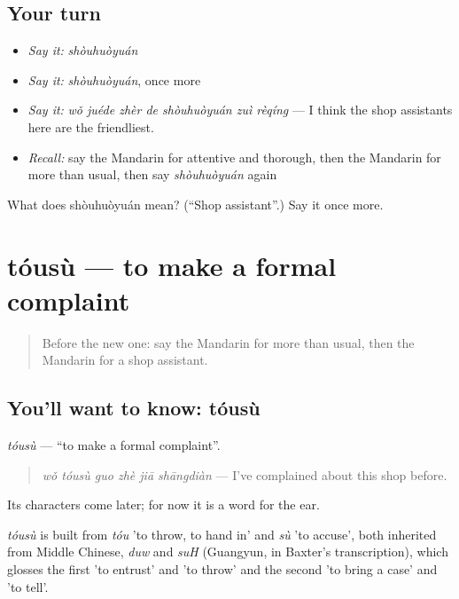 \subsection*{Your turn}
\begin{itemize}
\raggedright
  \item \emph{Say it:} \emph{shòuhuòyuán}
  \item \emph{Say it:} \emph{shòuhuòyuán}, once more
  \item \emph{Say it:} \emph{wǒ juéde zhèr de shòuhuòyuán zuì rèqíng} — I think the shop assistants here are the friendliest.
  \item \emph{Recall:} say the Mandarin for attentive and thorough, then the Mandarin for more than usual, then say \emph{shòuhuòyuán} again
\end{itemize}

\begin{tcolorbox}[breakable,colback=teal!4,colframe=teal!35!black,title={Before you move on}]
What does shòuhuòyuán mean? (\textquotedblleft{}Shop assistant\textquotedblright{}.) Say it once more.
\end{tcolorbox}
\section[tóusù]{tóusù — to make a formal complaint}

\label{lesson:ZH-C525-tousu}



\begin{quote}
Before the new one: say the Mandarin for more than usual, then the Mandarin for a shop assistant.
\end{quote}

\subsection*{You'll want to know: tóusù}
\emph{tóusù} — \textquotedblleft{}to make a formal complaint\textquotedblright{}.

\begin{quote}
\emph{wǒ tóusù guo zhè jiā shāngdiàn} — I've complained about this shop before.
\end{quote}

Its characters come later; for now it is a word for the ear.

\begin{cousinweb}
\emph{tóusù} is built from \emph{tóu} 'to throw, to hand in' and \emph{sù} 'to accuse', both inherited from Middle Chinese, \emph{duw} and \emph{suH} (Guangyun, in Baxter's transcription), which glosses the first 'to entrust' and 'to throw' and the second 'to bring a case' and 'to tell'.
\end{cousinweb}

